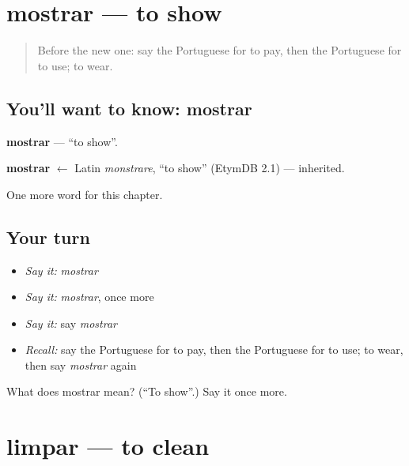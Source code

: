 \section[mostrar]{mostrar — to show}

\label{lesson:PT-C80-mostrar}



\begin{quote}
Before the new one: say the Portuguese for to pay, then the Portuguese for to use; to wear.
\end{quote}

\subsection*{You'll want to know: mostrar}
\textbf{mostrar} — \textquotedblleft{}to show\textquotedblright{}.

\begin{cousinweb}
\textbf{mostrar} $\leftarrow$ Latin \emph{monstrare}, \textquotedblleft{}to show\textquotedblright{} (EtymDB 2.1) — inherited.
\end{cousinweb}

\begin{grammarlens}[title={What you've built}]
One more word for this chapter.
\end{grammarlens}

\subsection*{Your turn}
\begin{itemize}
\raggedright
  \item \emph{Say it:} \emph{mostrar}
  \item \emph{Say it:} \emph{mostrar}, once more
  \item \emph{Say it:} say \emph{mostrar}
  \item \emph{Recall:} say the Portuguese for to pay, then the Portuguese for to use; to wear, then say \emph{mostrar} again
\end{itemize}

\begin{tcolorbox}[breakable,colback=teal!4,colframe=teal!35!black,title={Before you move on}]
What does mostrar mean? (\textquotedblleft{}To show\textquotedblright{}.) Say it once more.
\end{tcolorbox}
\section[limpar]{limpar — to clean}

